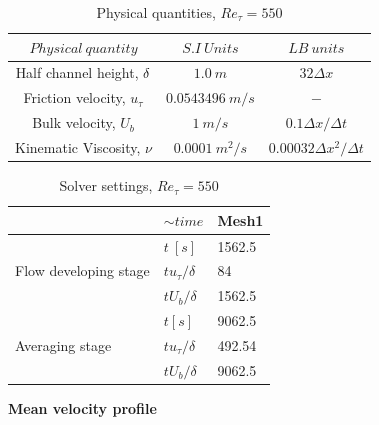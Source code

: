 %
\begin{table}[!h]
\centering
\begin{tabular}{c|c|c}
$ Physical\ quantity$ & $ S.I\ Units$ & $LB\ units$  \\
\hline
%
Half channel height, $\delta$ & $1.0\ m$ & $32\Delta x$\\
\hline
%
Friction velocity, $u_\tau$ & $0.0543496\ m/s$ & $-$ \\
\hline
%
Bulk velocity, $U_b$ & $1\ m/s$ & $0.1 \Delta x/ \Delta t$ \\
\hline
%
Kinematic Viscosity, $\nu$ & $0.0001\ m^2/s$ & $0.00032 \Delta x^2 / \Delta t$\\
\hline
%
\end{tabular}
\caption{Physical quantities, $Re_\tau = 550$}
\label{Physical quantities 550}
\end{table}
%
%
\begin{table}[h!]
\begin{center}
\begin{tabular}{ |p{2cm}|p{1.5cm}|p{2cm}|  } 
\hline
 &$\sim time$ & Mesh1 \\
  \hline
  \multirow{3}{6em}{Flow developing stage} & $t\ [s]$ & 1562.5  \\
  & $tu_\tau/\delta$ & 84 \\ 
  & $tU_b/\delta$ & 1562.5 \\ 
  \hline
  \multirow{3}{6em}{Averaging stage} & $t [s]$ & 9062.5 \\
  & $tu_\tau/\delta$ & 492.54  \\ 
  & $tU_b/\delta$ & 9062.5 \\ 
  \hline
\end{tabular}
\end{center}
\caption{Solver settings, $Re_\tau = 550$}
\label{Solver settings 550}
\end{table}
%
\textbf{Mean velocity profile}
%
